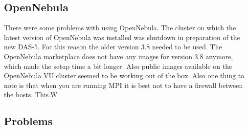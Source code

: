 \subsection{OpenNebula}
There were some problems with using OpenNebula. The cluster on which the latest version of OpenNebula was installed was shutdown in preparation of the new DAS-5. For this reason the older version 3.8 needed to be used. The OpenNebula marketplace does not have any images for version 3.8 anymore, which made the setup time a bit longer. Also public images available on the OpenNebula VU cluster seemed to be working out of the box. Also one thing to note is that when you are running MPI it is best not to have a firewall between the hosts. This.W

\subsection{Problems}
